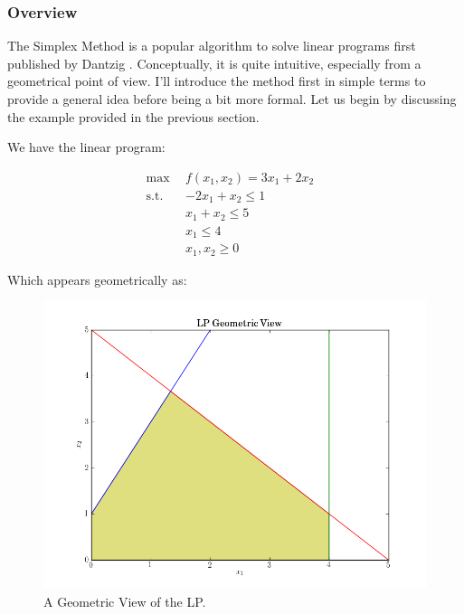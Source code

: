 \subsubsection{Overview}
The Simplex Method is a popular algorithm to solve linear programs first
published by Dantzig \cite{dantzig_maximization_1951}. Conceptually, it is quite
intuitive, especially from a geometrical point of view. I'll introduce the
method first in simple terms to provide a general idea before being a bit more
formal. Let us begin by discussing the example provided in the previous section.

We have the linear program:

\begin{subequations}\label{eqs:lp}
  \begin{align}
    \max \:\: & 
    f(x_1, x_2) = 3 x_1 + 2 x_2
    & \label{eqs:lp_obj} \\
    \text{s.t.} \:\: &
    -2 x_1 + x_2 \leq 1 \\
    &
    x_1 + x_2 \leq 5 
    & \label{eqs:lp_sup} \\
    &
    x_1 \leq 4
    &\label{eqs:lp_x1} \\
    &
    x_1, x_2 \geq 0
    &\label{eqs:lp_x2}
  \end{align}
\end{subequations}
 
Which appears geometrically as:

\begin{figure}[H]
  \begin{center}
    \includegraphics[width=\linewidth]{./chapters/litreview/plots/geometric.png}
  \caption{A Geometric View of the LP.}
  \label{fig:geometric}
  \end{center}
\end{figure}


